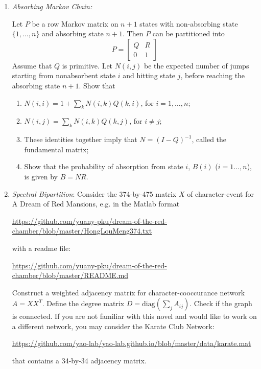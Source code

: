 \documentclass[11pt]{article}
\def\diag{{\mathrm{diag}}}
\begin{document}
\begin{enumerate}
\item {\em *Absorbing Markov Chain:} 

Let $P$ be a row Markov matrix on $n+1$ states with non-absorbing state $\{1,\ldots,n\}$ and absorbing state $n+1$. Then $P$ can be partitioned into 
\[
	P=\left[
	\begin{array}{cc} 
	Q & R \\ 
	0 & 1 
	\end{array} \right]
\]
Assume that $Q$ is primitive. Let $N(i,j)$ be the expected number of jumps starting from nonabsorbent state $i$ and hitting state $j$, before reaching the absorbing state $n+1$. Show
that
\begin{enumerate}
\item $N(i,i) = 1 + \sum_k N(i,k) Q(k,i)$, for $i=1,\ldots,n$;
\item $N(i,j) = \sum_k N(i,k) Q(k,j)$, for $i\neq j$;
\item These identities together imply that $N=(I-Q)^{-1}$, called the fundamental matrix; 
\item Show that the probability of absorption from state $i$, $B(i)$ ($i=1\ldots,n$), is given by $B=NR$.   
\end{enumerate}

\item {\em Spectral Bipartition}: Consider the 374-by-475 matrix $X$ of character-event for A Dream of Red Mansions, e.g. in the Matlab format 

\url{https://github.com/yuany-pku/dream-of-the-red-chamber/blob/master/HongLouMeng374.txt}

\noindent with a readme file:

\url{https://github.com/yuany-pku/dream-of-the-red-chamber/blob/master/README.md}

Construct a weighted adjacency matrix for character-cooccurance network $A=X X^T$. Define the degree matrix $D=\diag(\sum_j A_{ij})$. Check if the graph is connected. 
If you are not familiar with this novel and would like to work on a different network, you may consider the Karate Club Network: 

\url{https://github.com/yao-lab/yao-lab.github.io/blob/master/data/karate.mat} 

\noindent that contains a 34-by-34 adjacency matrix. 


\end{enumerate}
\end{document}
